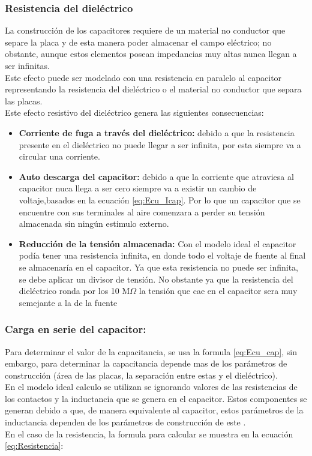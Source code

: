 \documentclass[journal]{IEEEtran}
\begin{document}
\subsubsection{Resistencia del dieléctrico}
 La construcción de los capacitores requiere de un material no conductor que separe la placa y de esta manera poder almacenar el campo eléctrico; no obstante, aunque estos elementos posean impedancias muy altas nunca llegan a ser infinitas.\\ Este efecto puede ser modelado con una resistencia en paralelo al capacitor representando la resistencia del dieléctrico o el material no conductor que separa las placas.\\ Este efecto resistivo del dieléctrico genera las siguientes consecuencias:
 \begin{itemize}
 	\item \textbf{Corriente de fuga a través del dieléctrico:} debido a que la resistencia presente en el dieléctrico no puede llegar a ser infinita, por esta siempre va a circular una corriente.
 	 \item \textbf{Auto descarga del capacitor: } debido a que la corriente que atraviesa al capacitor nuca llega a ser cero siempre va a existir un cambio de voltaje,basados en la ecuación \ref{eq:Ecu_Icap}. Por lo que un capacitor que se encuentre con sus terminales al aire comenzara a perder su tensión almacenada sin ningún estimulo externo.
 	 \item \textbf{Reducción de la tensión almacenada: } Con el modelo ideal el capacitor podía tener una resistencia infinita, en donde todo el voltaje de fuente al final se almacenaría en el capacitor. Ya que esta resistencia no puede ser infinita, se debe aplicar un divisor de tensión. No obstante ya que la resistencia del dieléctrico ronda por los 10 M\(\Omega\) la tensión que cae en el capacitor sera muy semejante a la de la fuente
 	  
 \end{itemize}
 
 \subsubsection{Carga en serie del capacitor: }Para determinar el valor de la capacitancia, se usa la formula \ref{eq:Ecu_cap}, sin embargo, para determinar la capacitancia depende mas de los parámetros de construcción (área de las placas, la separación entre estas y el dieléctrico).\\ En el modelo ideal calculo se utilizan se ignorando valores de las resistencias de los contactos y la inductancia que se genera en el capacitor. Estos componentes se generan debido a que, de manera equivalente al capacitor, estos parámetros de la inductancia dependen de los parámetros de construcción de este \cite{Saiku}.\\En el caso de la resistencia, la formula para calcular se muestra en la ecuación \ref{eq:Resistencia}: 
 
\end{document}
